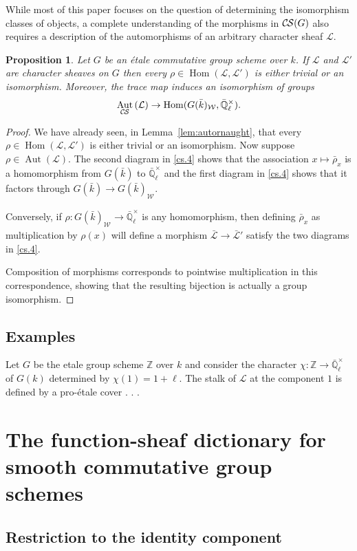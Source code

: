 \documentclass[10pt]{amsart}
\theoremstyle{plain}
\newtheorem{proposition}[theorem]{Proposition}
\theoremstyle{definition}
\newcommand{\ZZ}{{\mathbb{Z}}}
\newcommand{\EE}{\mathbb{\bar Q}_\ell}
\newcommand{\bFq}{\bar{k}}
\newcommand{\Fq}{k}
\newcommand{\EEx}{\EE^\times}
\newcommand{\Weil}[1]{\mathcal{W}_{#1}}
\DeclareMathOperator{\Aut}{Aut}
\DeclareMathOperator{\Hom}{Hom}
\newcommand{\cs}[1]{{\mathcal{#1}}}
\newcommand{\gcs}[1]{{\mathcal{\bar #1}}}
\newcommand{\CS}{{\mathcal{C\hskip-0.8pt S}}}
\newcommand{\brho}{{\bar\rho}}
\begin{document}
While most of this paper focuses on the question of determining the isomorphism classes of objects, a complete understanding of the morphisms in $\CS(G)$ also requires a description of the automorphisms of an arbitrary character sheaf $\cs{L}$.

\begin{proposition}\label{prop:autornaught_etale}
Let $G$ be an \'etale commutative group scheme over $\Fq$.
If $\cs{L}$ and $\cs{L}'$ are character sheaves on $G$ then
every $\rho\in \Hom(\cs{L},\cs{L}')$ is either trivial or an isomorphism. Moreover, the trace map induces an isomorphism of groups
\[
\Aut_\CS{}(\cs{L}) \to \Hom(G(\bFq)_{\Weil{}}, \EEx).
\]
\end{proposition}

\begin{proof}
We have already seen, in Lemma~\ref{lem:autornaught}, that every $\rho\in \Hom(\cs{L},\cs{L}')$ is either trivial or an isomorphism.
Now suppose $\rho \in \Aut(\cs{L})$.
The second diagram in \ref{cs.4} shows that the association $x \mapsto \brho_x$ is a homomorphism from $G(\bFq)$ to $\EEx$ and the first diagram in \ref{cs.4} shows that it factors through $G(\bFq) \to G(\bFq)_{\Weil{}}$.  

Conversely, if $\rho : G(\bFq)_{\Weil{}} \to \EEx$ is any homomorphism, then defining $\brho_x$ as multiplication by $\rho(x)$ will define a morphism $\gcs{L} \to \gcs{L}'$ satisfy the two diagrams in \ref{cs.4}.  

Composition of morphisms corresponds to pointwise multiplication in this correspondence, showing that the resulting bijection is actually a group isomorphism.
\end{proof}

\subsection{Examples}

Let $G$ be the etale group scheme $\ZZ$ over $\Fq$ and consider the character $\chi : \ZZ \to \EEx$ of $G(\Fq)$ determined by $\chi(1) = 1+\ell$.
The stalk of $\cs{L}$ at the component $1$ is defined
by a pro-\'etale cover  . . . 

\section{The function-sheaf dictionary for smooth commutative group schemes}\label{sec:main}


\subsection{Restriction to the identity component} \label{ssec:restriction}
\end{document}
